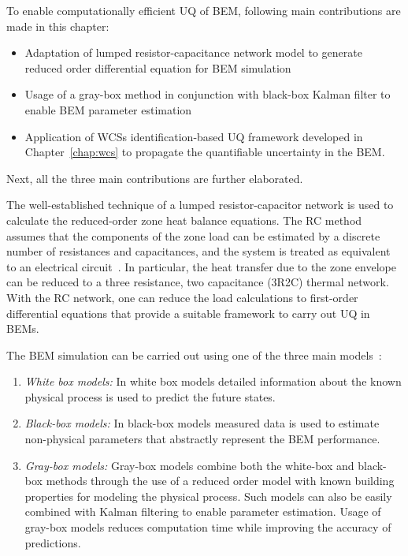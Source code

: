 To enable computationally efficient UQ of BEM, following main contributions are made in this chapter:

\begin{itemize}
\item Adaptation of lumped resistor-capacitance network model to generate reduced order differential equation for BEM simulation
\item Usage of a gray-box method in conjunction with black-box Kalman filter to enable BEM parameter estimation
\item Application of WCSs identification-based UQ framework developed in Chapter~\ref{chap:wcs} to propagate the quantifiable uncertainty in the BEM.
\end{itemize}

Next, all the three main contributions are further elaborated.

The well-established technique of a lumped resistor-capacitor network is used to calculate the reduced-order zone heat balance equations. The RC method assumes that the components of the zone load can be estimated by a discrete number of resistances and capacitances, and the system is treated as equivalent to an electrical circuit~\citep{vivian2017evaluation}. In particular, the heat transfer due to the zone envelope can be reduced to a three resistance, two capacitance (3R2C) thermal network. With the RC network, one can reduce the load calculations to first-order differential equations that provide a suitable framework to carry out UQ in BEMs. 

The BEM simulation can be carried out using one of the three main models~\citep{he2016simplified,perera2014modeling}:

\begin{enumerate}
\item \textit{White box models:} In white box models detailed information about the known physical process is used to predict the future states.
\item \textit{Black-box models:} In black-box models measured data is used to estimate non-physical parameters that abstractly represent the BEM performance.
\item \textit{Gray-box models:} Gray-box models combine both the white-box and black-box methods through the use of a reduced order model with known building properties for modeling the physical process. Such models can also be easily combined with Kalman filtering to enable parameter estimation. Usage of gray-box models reduces computation time while improving the accuracy of predictions.
\end{enumerate}

